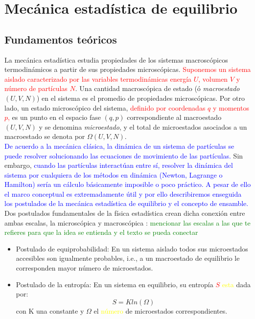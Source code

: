 % 
%
\chapter{Mecánica estadística de equilibrio}
\section{Fundamentos teóricos}
La mecánica estadística estudia propiedades de los sistemas macroscópicos termodinámicos a partir de sus propiedades microscópicas. \textcolor{red}{Suponemos un sistema aislado caracterizado por las variables termodinámicas energía $U$, volumen $V$ y número de partículas $N$}. Una cantidad macroscópica de estado (ó {\it macroestado} $(U,V,N)$) en el sistema es el promedio de propiedades microscópicas. Por otro lado, un estado microscópico del sistema, \textcolor{red}{definido por coordenadas $q$ y momentos $p$,} es un punto en el espacio fase $(q,p)$ correspondiente al macroestado $(U,V,N)$ y se denomina {\it microestado}, y el total de microestados asociados a un macroestado se denota por $\Omega(U,V,N)$.\\

\textcolor{blue}{De acuerdo a la mecánica clásica, la dinámica de un sistema de partículas se puede resolver solucionando las ecuaciones de movimiento de las partículas.}
Sin embargo, \textcolor{blue}{cuando las partículas interactúan entre sí, resolver la dinámica del sistema por cualquiera de los métodos en dinámica (Newton, Lagrange o Hamilton) sería un cálculo básicamente imposible o poco práctico. A pesar de ello el marco conceptual es extremadamente útil y por ello describiremos enseguida los postulados de la mecánica estadística de equilibrio y el concepto de ensamble.}\\

Dos postulados fundamentales de la física estadística crean dicha conexión entre ambas escalas, la microscópica y macroscópica \cite{tuckerman2010}: \textcolor{green}{mencionar las escalas a las que te refieres para que la idea se entienda y el texto se pueda conectar}\\

\begin{itemize}
    \item Postulado de equiprobabilidad: En un sistema aislado todos sus microestados accesibles son igualmente probables, i.e., a un macroestado de equilibrio le corresponden mayor número de microestados.\\
    
    \item Postulado de la entropía: En un sistema en equilibrio, su entropía \textcolor{red}{$S$} \textcolor{yellow}{esta} dada por:
    \begin{equation}
        S=Kln(\Omega)
    \end{equation}
    con K una constante y $\Omega$ el \textcolor{yellow}{número} de microestados correspondientes.
\end{itemize}


